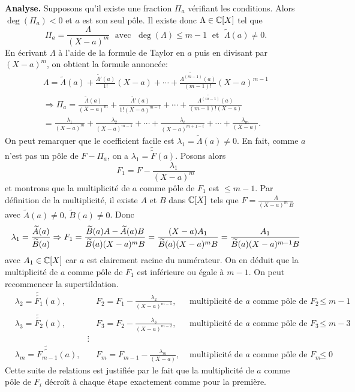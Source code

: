 \textbf{Analyse.}\newline
Supposons qu'il existe une fraction $\Pi_a$ vérifiant les conditions. Alors $\deg(\Pi_a) <0$ et $a$ est son seul pôle. Il existe donc $\Lambda \in \mathbb{C}[X]$ tel que 
\[
 \Pi_a = \frac{\Lambda}{(X-a)^m} \; \text{ avec } \; \deg(\Lambda) \leq m -1 \; \text{ et } \; \widetilde{\Lambda}(a) \neq 0.
\]
En écrivant $\Lambda$ à l'aide de la formule de Taylor en $a$ puis en divisant par $(X-a)^m$, on obtient la formule annoncée:
\begin{multline*}
 \Lambda = \widetilde{\Lambda}(a) + \frac{\widetilde{\Lambda'}(a)}{1!}(X-a) + \cdots + \frac{\widetilde{\Lambda^{(m-1)}}(a)}{(m-1)!}(X-a)^{m-1} \\
\Rightarrow
\Pi_a =\frac{\widetilde{\Lambda}(a)}{(X-a)^m} + \frac{\widetilde{\Lambda'}(a)}{1!(X-a)^{m-1}} + \cdots + \frac{\widetilde{\Lambda^{(m-1)}}(a)}{(m-1)!(X-a)} \\
  = \frac{\lambda_1}{(X-a)^m}+\frac{\lambda_2}{(X-a)^{m-1}}+\cdots +\frac{\lambda_i}{(X-a)^{m+1-i}}+\cdots+ \frac{\lambda_m}{(X-a)}.
\end{multline*}
On peut remarquer que le coefficient facile est $\lambda_1 = \widetilde{\Lambda}(a) \neq 0$.\newline
En fait, comme $a$ n'est pas un pôle de $F-\Pi_a$, on a  $\lambda_1 = \widetilde{\widetilde{F}}(a)$. Posons alors
\[
 F_1 = F -\frac{\lambda_1}{(X-a)^m}
\]
et montrons que la multiplicité de $a$ comme pôle de $F_1$ est $\leq m-1$.\newline
Par définition de la multiplicité, il existe $A$ et $B$ dans $\mathbb{C}[X]$ tels que $F = \frac{A}{(X-a)^m\,B}$  avec $\widetilde{A}(a)\neq 0$, $\widetilde{B}(a)\neq 0$. Donc
\[
 \lambda_1 = \frac{\widetilde{A}(a)}{\widetilde{B}(a)}\\
 \Rightarrow F_1 = \frac{\widetilde{B}(a)A-\widetilde{A}(a)B}{\widetilde{B}(a)(X-a)^mB}=\frac{(X-a)A_1}{\widetilde{B}(a)(X-a)^mB}
=\frac{A_1}{\widetilde{B}(a)(X-a)^{m-1}B}
\]
avec $A_1\in \mathbb{C}[X]$ car $a$ est clairement racine du numérateur. On en déduit que la multiplicité de $a$ comme pôle de $F_1$ est inférieure ou égale à $m-1$. \newline
On peut recommencer la supertildation.
\begin{align*}
 &\lambda_2 = \widetilde{\widetilde{F_1}}(a),& &F_2 = F_1 -\frac{\lambda_2}{(X-a)^{m-1}},   &\text{ multiplicité de $a$ comme pôle de $F_2$ } \leq m-1\\
 &\lambda_3 = \widetilde{\widetilde{F_2}}(a),& &F_3 = F_2 -\frac{\lambda_3}{(X-a)^{m-2}}, &\text{ multiplicité de $a$ comme pôle de $F_3$ } \leq m-3\\
&  & \vdots & & \\
&\lambda_m = \widetilde{\widetilde{F_{m-1}}}(a),& &F_m = F_{m-1} -\frac{\lambda_m}{(X-a)}, &\text{ multiplicité de $a$ comme pôle de $F_m$} \leq 0
\end{align*}
Cette suite de relations est justifiée par le fait que la multiplicité de $a$ comme pôle de $F_i$ décroît à chaque étape exactement comme pour la première. 


